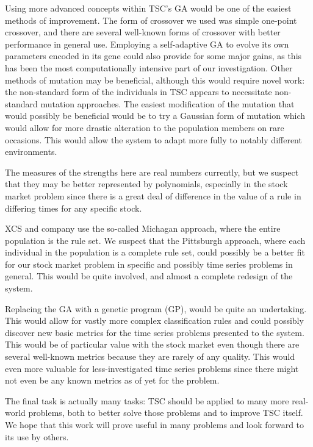 Using more advanced concepts within TSC's GA would be one of the easiest methods of improvement.
The form of crossover we used was simple one-point crossover, and there are several well-known forms of crossover with better performance in general use.
Employing a self-adaptive GA to evolve its own parameters encoded in its gene could also provide for some major gains, as this has been the most computationally intensive part of our investigation.
Other methods of mutation may be beneficial, although this would require novel work: the non-standard form of the individuals in TSC appears to necessitate non-standard mutation approaches.
The easiest modification of the mutation that would possibly be beneficial would be to try a Gaussian form of mutation which would allow for more drastic alteration to the population members on rare occasions.
This would allow the system to adapt more fully to notably different environments.

The measures of the strengths here are real numbers currently, but we suspect that they may be better represented by polynomials, especially in the stock market problem since there is a great deal of difference in the value of a rule in differing times for any specific stock.

XCS and company use the so-called Michagan approach, where the entire population is the rule set.
We suspect that the Pittsburgh approach, where each individual in the population is a complete rule set, could possibly be a better fit for our stock market problem in specific and possibly time series problems in general.
This would be quite involved, and almost a complete redesign of the system.

Replacing the GA with a genetic program (GP), would be quite an undertaking.
This would allow for vastly more complex classification rules and could possibly discover new basic metrics for the time series problems presented to the system.
This would be of particular value with the stock market even though there are several well-known metrics because they are  rarely of any quality.
This would even more valuable for less-investigated time series problems since there might not even be any known metrics as of yet for the problem.

\enlargethispage{2\baselineskip}
The final task is actually many tasks: TSC should be applied to many more real-world problems, both to better solve those problems and to improve TSC itself.
We hope that this work will prove useful in many problems and look forward to its use by others.
